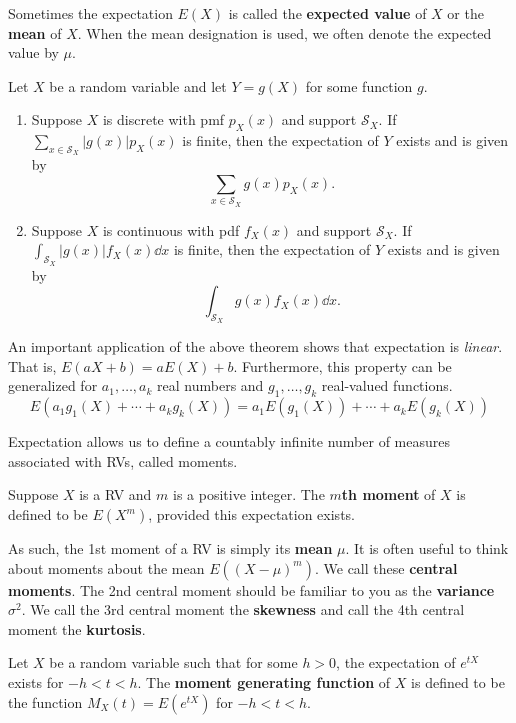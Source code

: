 Sometimes the expectation $E(X)$ is called the \textbf{expected value} of $X$ or the \textbf{mean} of $X$. When the mean designation is used, we often denote the expected value by $\mu$.

\begin{theorem}[]
	Let $X$ be a random variable and let $Y=g(X)$ for some function $g$.
	\begin{enumerate}[label=\color{main}(\alph*)]
		\item Suppose $X$ is discrete with pmf $p_X(x)$ and support $\mathcal S_X$. If $\sum_{x\in\mathcal S_X}|g(x)|p_X(x)$ is finite, then the expectation of $Y$ exists and is given by $$\sum_{x\in\mathcal S_X}g(x)p_X(x).$$
		\item Suppose $X$ is continuous with pdf $f_X(x)$ and support $\mathcal S_X$. If $\int_{\mathcal S_X}|g(x)|f_X(x)\dd x$ is finite, then the expectation of $Y$ exists and is given by $$\int_{\mathcal S_X}g(x)f_X(x)\dd x.$$
	\end{enumerate}
\end{theorem}

An important application of the above theorem shows that expectation is \textit{linear}. That is, $E(aX+b)=aE(X)+b$. Furthermore, this property can be generalized for $a_1,\hdots,a_k$ real numbers and $g_1,\hdots,g_k$ real-valued functions.
$$E(a_1g_1(X)+\cdots+a_kg_k(X))=a_1E(g_1(X))+\cdots+a_kE(g_k(X))$$

Expectation allows us to define a countably infinite number of measures associated with RVs, called moments.

\begin{definition}[moment]
	Suppose $X$ is a RV and $m$ is a positive integer. The \textbf{$m$th moment} of $X$ is defined to be $E(X^m)$, provided this expectation exists.
\end{definition}

As such, the 1st moment of a RV is simply its \textbf{mean} $\mu$. It is often useful to think about moments about the mean $E((X-\mu)^m)$. We call these \textbf{central moments}. The 2nd central moment should be familiar to you as the \textbf{variance} $\sigma^2$. We call the 3rd central moment the \textbf{skewness} and call the 4th central moment the \textbf{kurtosis}.

\begin{definition}
	Let $X$ be a random variable such that for some $h>0$, the expectation of $e^{tX}$ exists for $-h<t<h$. The \textbf{moment generating function} of $X$ is defined to be the function $M_X(t)=E(e^{tX})$ for $-h<t<h$.
\end{definition}


